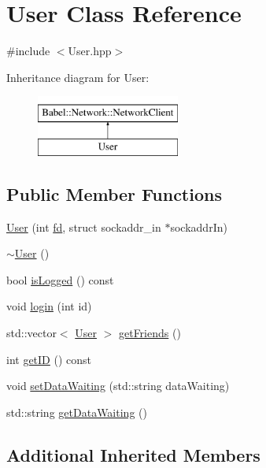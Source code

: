 \hypertarget{classUser}{}\section{User Class Reference}
\label{classUser}


{\ttfamily \#include $<$User.\+hpp$>$}

Inheritance diagram for User\+:\begin{figure}[H]
\begin{center}
\leavevmode
\includegraphics[height=2.000000cm]{classUser}
\end{center}
\end{figure}
\subsection*{Public Member Functions}
\begin{DoxyCompactItemize}
\item 
\hyperlink{classUser_ade435ecd7d7f5e673b0fb05eb42697f1}{User} (int \hyperlink{classBabel_1_1Network_1_1NetworkClient_ae1d6dc854cbc956a4bd00d059265fb02}{fd}, struct sockaddr\+\_\+in $\ast$sockaddr\+In)
\item 
\hyperlink{classUser_ac00b72ad64eb4149f7b21b9f5468c2b2}{$\sim$\+User} ()
\item 
bool \hyperlink{classUser_a58d16c117e5c0577c793364496e78e20}{is\+Logged} () const
\item 
void \hyperlink{classUser_ad46962bd5857b933726825a88214cd96}{login} (int id)
\item 
std\+::vector$<$ \hyperlink{classUser}{User} $>$ \hyperlink{classUser_ae3bf4d054a93b7d32aca8d5ccdcd1fd5}{get\+Friends} ()
\item 
int \hyperlink{classUser_a986c6f30aeac167bb5d311dd412cf604}{get\+ID} () const
\item 
void \hyperlink{classUser_a893e59448e3e3b7da39daf6caa631ade}{set\+Data\+Waiting} (std\+::string data\+Waiting)
\item 
std\+::string \hyperlink{classUser_a790cbfc550e023e18927801a275830a8}{get\+Data\+Waiting} ()
\end{DoxyCompactItemize}
\subsection*{Additional Inherited Members}


